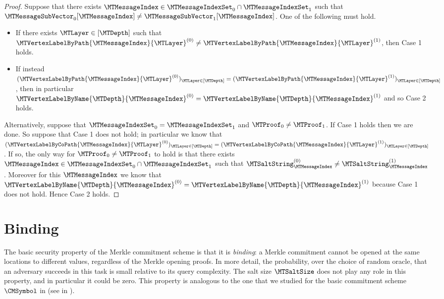 \begin{proof}
Suppose that there exists $\MTMessageIndex \in \MTMessageIndexSet_{0} \cap \MTMessageIndexSet_{1}$ such that $\MTMessageSubVector_{0}[\MTMessageIndex] \neq \MTMessageSubVector_{1}[\MTMessageIndex]$. One of the following must hold.
\begin{itemize}[nolistsep]
  \item If there exists $\MTLayer \in [\MTDepth]$ such that $\MTVertexLabelByPath{\MTMessageIndex}{\MTLayer}^{(0)} \neq \MTVertexLabelByPath{\MTMessageIndex}{\MTLayer}^{(1)}$, then Case 1 holds.
  \item If instead $(\MTVertexLabelByPath{\MTMessageIndex}{\MTLayer}^{(0)})_{\MTLayer \in [\MTDepth]}=(\MTVertexLabelByPath{\MTMessageIndex}{\MTLayer}^{(1)})_{\MTLayer \in [\MTDepth]}$, then in particular $\MTVertexLabelByName{\MTDepth}{\MTMessageIndex}^{(0)}=\MTVertexLabelByName{\MTDepth}{\MTMessageIndex}^{(1)}$ and so Case 2 holds.
\end{itemize}

Alternatively, suppose that $\MTMessageIndexSet_{0} = \MTMessageIndexSet_{1}$ and $\MTProof_{0} \neq \MTProof_{1}$. If Case 1 holds then we are done. So suppose that Case 1 does not hold; in particular we know that $(\MTVertexLabelByCoPath{\MTMessageIndex}{\MTLayer}^{(0)})_{\MTLayer \in [\MTDepth]}=(\MTVertexLabelByCoPath{\MTMessageIndex}{\MTLayer}^{(1)})_{\MTLayer \in [\MTDepth]}$. If so, the only way for $\MTProof_{0} \neq \MTProof_{1}$ to hold is that there exists $\MTMessageIndex \in \MTMessageIndexSet_{0} \cap \MTMessageIndexSet_{1}$ such that $\MTSaltString_{\MTMessageIndex}^{(0)} \neq \MTSaltString_{\MTMessageIndex}^{(1)}$. Moreover for this $\MTMessageIndex$ we know that $\MTVertexLabelByName{\MTDepth}{\MTMessageIndex}^{(0)}=\MTVertexLabelByName{\MTDepth}{\MTMessageIndex}^{(1)}$ because Case 1 does not hold. Hence Case 2 holds.
\end{proof}





\section{Binding}
\label{section:merkle-commitment-binding}

The basic security property of the Merkle commitment scheme is that it is \emph{binding}: a Merkle commitment cannot be opened at the same locations to different values, regardless of the Merkle opening proofs. In more detail, the probability, over the choice of random oracle, that an adversary succeeds in this task is small relative to its query complexity. The salt size $\MTSaltSize$ does not play any role in this property, and in particular it could be zero. This property is analogous to the one that we studied for the basic commitment scheme $\CMSymbol$ in  (see  in ).

